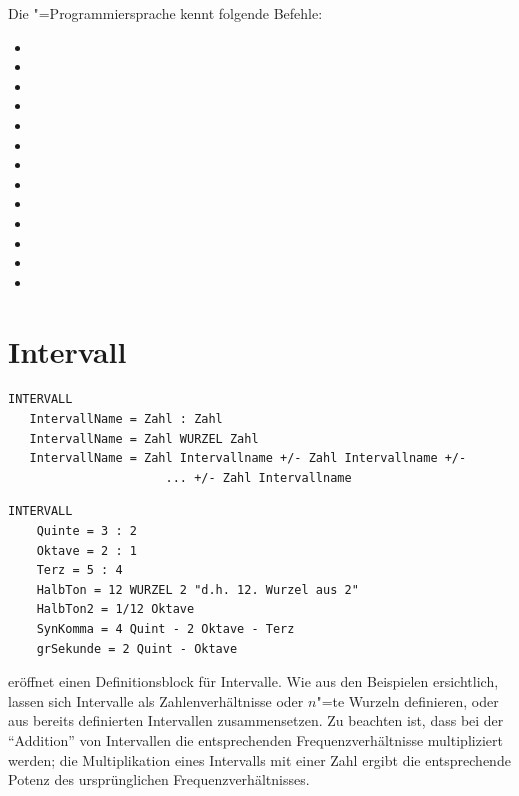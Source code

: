 Die \mutabor{}"=Programmiersprache kennt folgende Befehle:

\begin{itemize}
\item {}
\item {}
\item {}
\item {}
\item {}
\item {}
\item {}
\item {}
\item {}
\item {}
\item {}
\item {}
\item {}
\end{itemize}

\section{Intervall}
\label{sec:SX_INTERVAL}



\begin{verbatim}
INTERVALL
   IntervallName = Zahl : Zahl
   IntervallName = Zahl WURZEL Zahl
   IntervallName = Zahl Intervallname +/- Zahl Intervallname +/- 
                      ... +/- Zahl Intervallname
\end{verbatim}



\begin{verbatim}
INTERVALL
    Quinte = 3 : 2 
    Oktave = 2 : 1 
    Terz = 5 : 4 
    HalbTon = 12 WURZEL 2 "d.h. 12. Wurzel aus 2" 
    HalbTon2 = 1/12 Oktave 
    SynKomma = 4 Quint - 2 Oktave - Terz 
    grSekunde = 2 Quint - Oktave
\end{verbatim}




 eröffnet einen Definitionsblock für Intervalle.  Wie aus den
Beispielen ersichtlich, lassen sich Intervalle als Zahlenverhältnisse
oder $n$"=te Wurzeln definieren, oder aus bereits definierten
Intervallen zusammensetzen. Zu beachten ist, dass bei der "`Addition"'
von Intervallen die entsprechenden Frequenzverhältnisse multipliziert
werden; die Multiplikation eines Intervalls mit einer Zahl ergibt die
entsprechende Potenz des ursprünglichen Frequenzverhältnisses.

